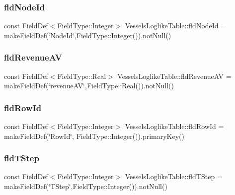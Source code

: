 \mbox{\label{class_vessels_loglike_table_aed561c6f88f793d3b188932acef49c83}} 
\subsubsection{\texorpdfstring{fldNodeId}{fldNodeId}}
{\footnotesize\ttfamily const Field\+Def$<$Field\+Type\+::\+Integer$>$ Vessels\+Loglike\+Table\+::fld\+Node\+Id = make\+Field\+Def(\char`\"{}Node\+Id\char`\"{},Field\+Type\+::\+Integer()).not\+Null()}

\mbox{\label{class_vessels_loglike_table_abbaeb4d148ab4fba8c29ca5a076136bd}} 
\subsubsection{\texorpdfstring{fldRevenueAV}{fldRevenueAV}}
{\footnotesize\ttfamily const Field\+Def$<$Field\+Type\+::\+Real$>$ Vessels\+Loglike\+Table\+::fld\+Revenue\+AV = make\+Field\+Def(\char`\"{}revenue\+AV\char`\"{},Field\+Type\+::\+Real()).not\+Null()}

\mbox{\label{class_vessels_loglike_table_aeea370cbf8532b39a594484d508c6a6b}} 
\subsubsection{\texorpdfstring{fldRowId}{fldRowId}}
{\footnotesize\ttfamily const Field\+Def$<$Field\+Type\+::\+Integer$>$ Vessels\+Loglike\+Table\+::fld\+Row\+Id = make\+Field\+Def(\char`\"{}Row\+Id\char`\"{}, Field\+Type\+::\+Integer()).primary\+Key()}

\mbox{\label{class_vessels_loglike_table_a604a389b3099f0e67413b2330f33834f}} 
\subsubsection{\texorpdfstring{fldTStep}{fldTStep}}
{\footnotesize\ttfamily const Field\+Def$<$Field\+Type\+::\+Integer$>$ Vessels\+Loglike\+Table\+::fld\+T\+Step = make\+Field\+Def(\char`\"{}T\+Step\char`\"{},Field\+Type\+::\+Integer()).not\+Null()}

